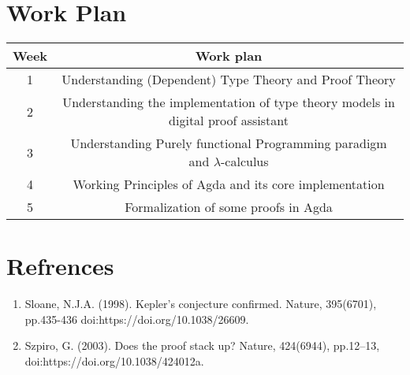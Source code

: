 \documentclass{article}
\begin{document}
\section{Work Plan}
\begin{center}
    \begin{tabular}{|c|c|}
        \hline
        Week & Work plan \\
        \hline
         1 & Understanding (Dependent) Type Theory and Proof Theory\\
        \hline
         2 & Understanding the implementation of type theory models in digital proof assistant \\
        \hline
         3 & Understanding Purely functional Programming paradigm and $ \lambda $-calculus\\
        \hline
         4 & Working Principles of Agda and its core implementation \\
        \hline 
         5 & Formalization of some proofs in Agda \\
        \hline


    \end{tabular}
\end{center}
\pagebreak


\section{Refrences}
\begin{enumerate}
    \item Sloane, N.J.A. (1998). Kepler's conjecture confirmed. Nature, 395(6701), pp.435-436 doi:https://doi.org/10.1038/26609.
    \item Szpiro, G. (2003). Does the proof stack up? Nature, 424(6944), pp.12–13,  doi:https://doi.org/10.1038/424012a.

\end{enumerate} 
\end{document}
